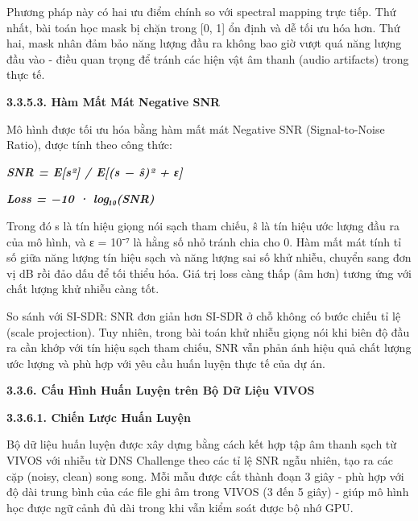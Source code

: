 \documentclass[
  13pt,
]{article}
\begin{document}
Phương pháp này có hai ưu điểm chính so với spectral mapping trực tiếp.
Thứ nhất, bài toán học mask bị chặn trong {[}0, 1{]} ổn định và dễ tối
ưu hóa hơn. Thứ hai, mask nhân đảm bảo năng lượng đầu ra không bao giờ
vượt quá năng lượng đầu vào - điều quan trọng để tránh các hiện vật âm
thanh (audio artifacts) trong thực tế.

\textbf{3.3.5.3. Hàm Mất Mát Negative SNR}

Mô hình được tối ưu hóa bằng hàm mất mát Negative SNR (Signal-to-Noise
Ratio), được tính theo công thức:

\textbf{\emph{SNR = E{[}s²{]} / E{[}(s − ŝ)² + ε{]}}}

\textbf{\emph{Loss = −10 · log₁₀(SNR)}}

Trong đó s là tín hiệu giọng nói sạch tham chiếu, ŝ là tín hiệu ước
lượng đầu ra của mô hình, và ε = 10⁻⁷ là hằng số nhỏ tránh chia cho 0.
Hàm mất mát tính tỉ số giữa năng lượng tín hiệu sạch và năng lượng sai
số khử nhiễu, chuyển sang đơn vị dB rồi đảo dấu để tối thiểu hóa. Giá
trị loss càng thấp (âm hơn) tương ứng với chất lượng khử nhiễu càng tốt.

So sánh với SI-SDR: SNR đơn giản hơn SI-SDR ở chỗ không có bước chiếu tỉ
lệ (scale projection). Tuy nhiên, trong bài toán khử nhiễu giọng nói khi
biên độ đầu ra cần khớp với tín hiệu sạch tham chiếu, SNR vẫn phản ánh
hiệu quả chất lượng ước lượng và phù hợp với yêu cầu huấn luyện thực tế
của dự án.

\textbf{3.3.6. Cấu Hình Huấn Luyện trên Bộ Dữ Liệu VIVOS}

\textbf{3.3.6.1. Chiến Lược Huấn Luyện}

Bộ dữ liệu huấn luyện được xây dựng bằng cách kết hợp tập âm thanh sạch
từ VIVOS với nhiễu từ DNS Challenge theo các tỉ lệ SNR ngẫu nhiên, tạo
ra các cặp (noisy, clean) song song. Mỗi mẫu được cắt thành đoạn 3 giây
- phù hợp với độ dài trung bình của các file ghi âm trong VIVOS (3 đến 5
giây) - giúp mô hình học được ngữ cảnh đủ dài trong khi vẫn kiểm soát
được bộ nhớ GPU.
\end{document}
